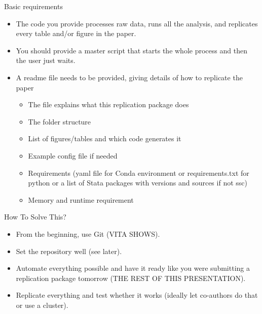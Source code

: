 \documentclass{beamer}
\begin{document}
      \begin{frame}{Basic requirements}
	\begin{itemize}
      		\item The code you provide processes raw data, runs all the analysis, and replicates every table and/or figure in the paper.
		\item You should provide a master script that starts the whole process and then the user just waits.
		\item A readme file needs to be provided, giving details of how to replicate the paper
		\begin{itemize}
			\item The file explains what this replication package does
			\item The folder structure
			\item List of figures/tables and which code generates it
			\item Example config file if needed
			\item Requirements (yaml file for Conda environment or requirements.txt for python or a list of Stata packages with versions and sources if not ssc)
			\item Memory and runtime requirement
		\end{itemize}      
	\end{itemize}      
      \end{frame}
      
       \begin{frame}{How To Solve This?}
       		\begin{itemize}
			\item From the beginning, use Git (VITA SHOWS).
			\item Set the repository well (see later).
			\item Automate everything possible and have it ready like you were submitting a replication package tomorrow (THE REST OF THIS PRESENTATION).
			\item Replicate everything and test whether it works (ideally let co-authors do that or use a cluster).
		\end{itemize}
       \end{frame}
           
      
\end{document}
